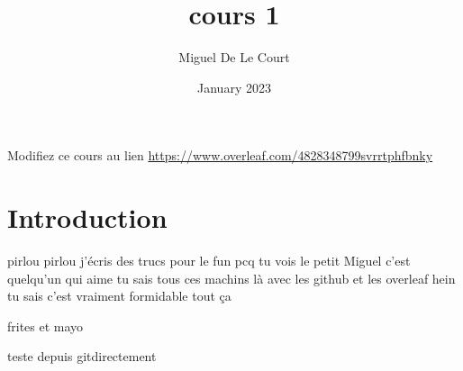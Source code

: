 \documentclass{article}
\title{cours 1}
\author{Miguel De Le Court}
\date{January 2023}
\begin{document}
\maketitle
Modifiez ce cours au lien \url{https://www.overleaf.com/4828348799svrrtphfbnky}

\section{Introduction}


pirlou pirlou j'écris des trucs pour le fun pcq tu vois le petit Miguel c'est quelqu'un qui aime tu sais tous ces machins là avec les github et les overleaf hein tu sais c'est vraiment formidable tout ça

frites et mayo

teste depuis gitdirectement
\end{document}
